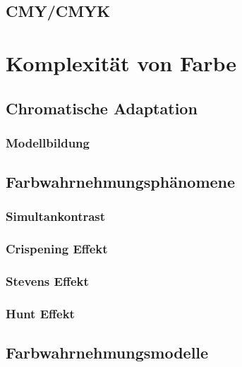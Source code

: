 \documentclass[a4paper, 11pt, accentcolor = tud3b]{tudreport}
\begin{document}
			\subsection{CMY/CMYK} %

		\section{Komplexität von Farbe} %

			\subsection{Chromatische Adaptation} %

				\subsubsection{Modellbildung} %

			\subsection{Farbwahrnehmungsphänomene} %

				\subsubsection{Simultankontrast} %

				\subsubsection{Crispening Effekt} %

				\subsubsection{Stevens Effekt} %

				\subsubsection{Hunt Effekt} %

			\subsection{Farbwahrnehmungsmodelle} %
\end{document}
